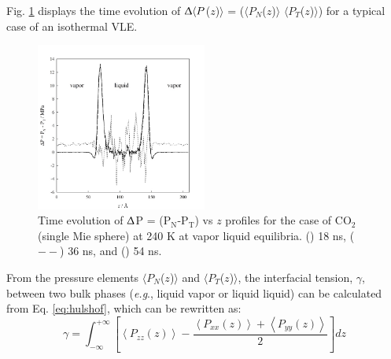 \documentclass[9pt,tutorial]{livecoms}
\begin{document}
Fig. \ref{fig:17} displays the time evolution of 
${\Updelta}{\langle}P$($z$)${\rangle}$
= (${\langle}P_{N}$($z$)${\rangle}$ \textendash{}
${\langle}P_{T}$($z$)${\rangle}$) for a typical case of an
isothermal VLE. 
\begin{figure}
\includegraphics[width=0.5\textwidth]{gfx/image61.jpeg}
\caption{Time evolution of {${\Updelta}$}P = (P$_{\mathrm{N}}$-P$_{\mathrm{T}}$) vs $z$ profiles for the case of CO$_{2}$ (single Mie sphere) at 240 K at vapor \textendash{} liquid equilibria. ({\textbullet}{\textbullet}{\textbullet}) 18 ns, (${-}{-}$) 36 ns, and (\textemdash) 54 ns.}
\label{fig:17}
\end{figure}
From the pressure elements ${\langle}P_{N}$($z$)${\rangle}$
and ${\langle}P_{T}$($z$)${\rangle}$, the interfacial
tension, ${\gamma}$, between two bulk phases (\textit{e.g}., liquid
\textendash{} vapor or liquid \textendash{} liquid) can be calculated from Eq.
\ref{eq:hulshof}, which can be rewritten as:
\begin{equation}
\gamma=\int_{{\scriptstyle -\infty}}^{{\scriptstyle +\infty}}\left[\left\langle P_{zz}\left(z\right)\right\rangle -\frac{\left\langle P_{xx}\left(z\right)\right\rangle +\left\langle P_{yy}\left(z\right)\right\rangle }{2}\right]dz
  \label{eq:12}
\end{equation}
\end{document}
